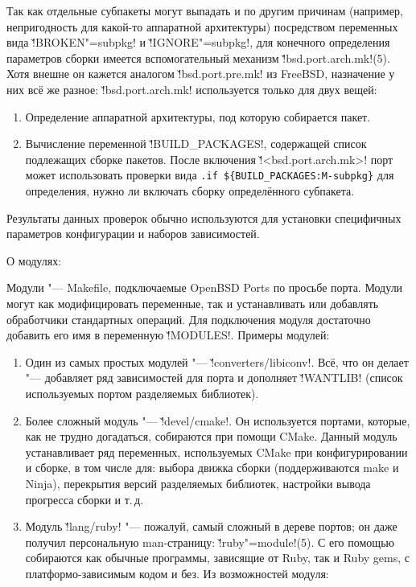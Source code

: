 \documentclass[10pt, a5paper]{article}
\begin{document}
Так как отдельные субпакеты могут выпадать и по другим причинам (например, непригодность для какой-то аппаратной архитектуры) посредством переменных вида \v!BROKEN"=subpkg! и \v!IGNORE"=subpkg!, для конечного определения параметров сборки имеется \linebreak вспомогательный механизм \v!bsd.port.arch.mk!(5). Хотя внешне он кажется аналогом \v!bsd.port.pre.mk! из FreeBSD, назначение у них всё же разное: \v!bsd.port.arch.mk! используется только для двух вещей:
\begin{enumerate}
  \item Определение аппаратной архитектуры, под которую собирается пакет.
  \item Вычисление переменной \v!BUILD\_PA\-CKA\-GES!, содержащей список подлежащих сборке пакетов. После включения \linebreak \v!<bsd.port.arch.mk>! порт может использовать проверки вида \linebreak \texttt{.if \$\{BUILD\_PA\-CKA\-GES:M-subpkg\}} для определения, нужно ли включать сборку определённого субпакета.
\end{enumerate}

Результаты данных проверок обычно используются для установки специфичных параметров конфигурации и наборов зависимостей.

О модулях:

Модули "--- Makefile, подключаемые OpenBSD Ports по просьбе порта. Модули могут как модифицировать переменные, так и устанавливать или добавлять обработчики стандартных операций. Для подключения модуля достаточно добавить его имя в переменную \v!MODULES!. Примеры модулей:

\begin{enumerate}
  \item Один из самых простых модулей "--- \v!converters/libiconv!. Всё, что он делает "--- добавляет ряд зависимостей для порта и дополняет \v!WANTLIB! (список используемых портом разделяемых библиотек).
  \item Более сложный модуль "--- \v!devel/cmake!. Он используется портами, которые, как не трудно догадаться, собираются при помощи CMake. Данный модуль устанавливает ряд переменных, используемых CMake при конфигурировании и сборке, в том числе для: выбора движка сборки (поддерживаются make и Ninja), перекрытия версий разделяемых библиотек, настройки вывода прогресса сборки и т.\,д.
  \item Модуль \v!lang/ruby! "--- пожалуй, самый сложный в дереве портов; он даже получил персональную man-страницу: \linebreak\v!ruby"=module!(5). С его помощью собираются как обычные программы, зависящие от Ruby, так и Ruby gems, с платформо-зависимым кодом и без. Из возможностей модуля:
\end{enumerate}
\end{document}
